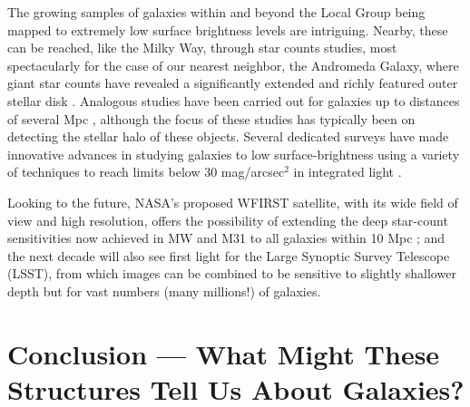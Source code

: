 \documentclass[galaxies,article,submit,moreauthors,pdftex,10pt,a4paper]{mdpi}
\begin{document}
The growing samples of galaxies within and beyond the Local Group being mapped to extremely low surface brightness levels are intriguing.
Nearby, these can be reached, like the Milky Way, through star counts studies, most spectacularly for the case of our nearest neighbor, the Andromeda Galaxy, where giant star counts have revealed a significantly extended and richly featured outer stellar disk \cite{ferguson02,ibata05}.
Analogous studies have been carried out for galaxies up to distances of several Mpc \cite[e.g.,][]{monachesi13,crnojevi16}, although the focus of these studies has typically been on detecting the stellar halo of these objects.
Several dedicated surveys have made innovative advances in studying galaxies to low surface-brightness using a variety of techniques to reach limits below 30 mag/arcsec$^2$ in integrated light \citep[e.g.][]{delgado10,vandokkum14,duc15}.

Looking to the future,
NASA's proposed WFIRST satellite, with its wide field of view and high resolution, offers the possibility of extending the deep star-count sensitivities now achieved in MW and M31 to all galaxies within 10 Mpc \cite{spergel13}; and
the next decade will also see first light for the Large Synoptic Survey Telescope (LSST), from which images can be combined to be sensitive to slightly shallower depth \citep[$\sim$29 mag/arcsec$^2$, see][]{ivezic08} but for vast numbers (many millions!) of galaxies.


\section{Conclusion --- What Might These Structures Tell Us About Galaxies?}

\end{document}
